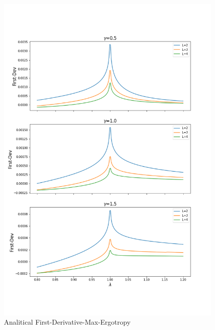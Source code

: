 \documentclass[12pt,a4paper]{book}
\theoremstyle{definition}
\begin{document}
\begin{figure}
	\includegraphics[width=\linewidth]{graphs/firstdev_234_3gammas}
	\caption{Analitical First-Derivative-Max-Ergotropy}
	\label{fig:first2343gammas}
\end{figure}
\end{document}
